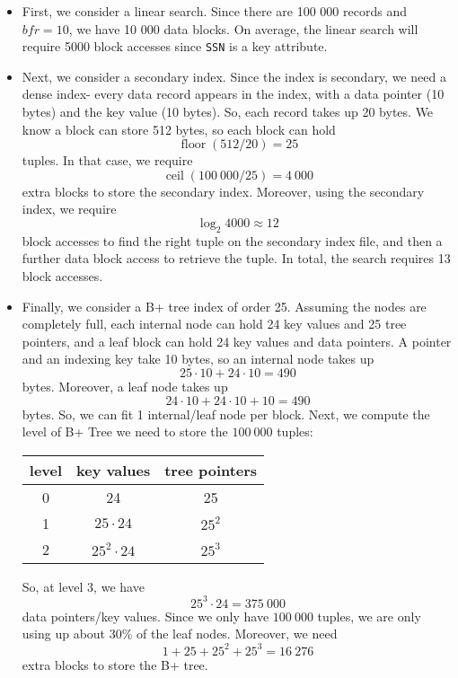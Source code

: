 \documentclass[a4paper, openany]{memoir}
\theoremstyle{definition}
\begin{document}
\begin{answer}
    \begin{itemize}
        \item First, we consider a linear search. Since there are 100 000 records and $\textit{bfr} = 10$, we have 10 000 data blocks. On average, the linear search will require 5000 block accesses since \texttt{SSN} is a key attribute.
        
        \item Next, we consider a secondary index. Since the index is secondary, we need a dense index- every data record appears in the index, with a data pointer (10 bytes) and the key value (10 bytes). So, each record takes up 20 bytes. We know a block can store 512 bytes, so each block can hold
        \[\operatorname{floor}(512/20) = 25\]
        tuples. In that case, we require
        \[\operatorname{ceil}(100 \ 000/25) = 4 \ 000\]
        extra blocks to store the secondary index. Moreover, using the secondary index, we require 
        \[\log_2 4000 \approx 12\]
        block accesses to find the right tuple on the secondary index file, and then a further data block access to retrieve the tuple. In total, the search requires 13 block accesses.
        
        \item Finally, we consider a B+ tree index of order 25. Assuming the nodes are completely full, each internal node can hold 24 key values and 25 tree pointers, and a leaf block can hold 24 key values and data pointers. A pointer and an indexing key take 10 bytes, so an internal node takes up
        \[25 \cdot 10 + 24 \cdot 10 = 490\]
        bytes. Moreover, a leaf node takes up
        \[24 \cdot 10 + 24 \cdot 10 + 10 = 490\]
        bytes. So, we can fit 1 internal/leaf node per block. Next, we compute the level of B+ Tree we need to store the $100 \ 000$ tuples:
        \begin{table}[H]
            \centering
            \begin{tabular}{|c|c|c|}
                \hline
                level & key values & tree pointers \\
                \hline
                0 & 24 & 25 \\
                1 & $25 \cdot 24$ & $25^2$ \\
                2 & $25^2 \cdot 24$ & $25^3$ \\
                \hline
            \end{tabular}
        \end{table}
        So, at level 3, we have
        \[25^3 \cdot 24 = 375 \ 000\]
        data pointers/key values. Since we only have $100 \ 000$ tuples, we are only using up about $30\%$ of the leaf nodes. Moreover, we need
        \[1 + 25 + 25^2 + 25^3 = 16 \ 276\]
        extra blocks to store the B+ tree. 
        

\end{itemize}
\end{answer}
\end{document}

